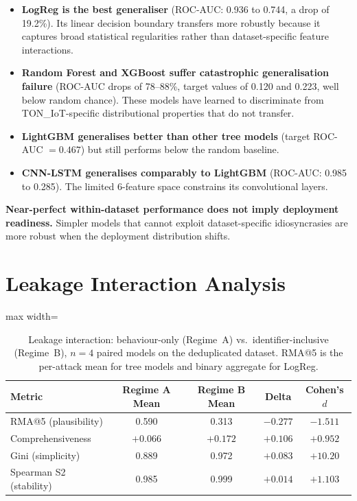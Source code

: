 \documentclass[12pt,a4paper]{report}
\begin{document}
\begin{itemize}
  \item \textbf{LogReg is the best generaliser} (ROC-AUC: 0.936 to 0.744, a drop of 19.2\%). Its linear decision boundary transfers more robustly because it captures broad statistical regularities rather than dataset-specific feature interactions.
  \item \textbf{Random Forest and XGBoost suffer catastrophic generalisation failure} (ROC-AUC drops of 78--88\%, target values of 0.120 and 0.223, well below random chance). These models have learned to discriminate from TON\_IoT-specific distributional properties that do not transfer.
  \item \textbf{LightGBM generalises better than other tree models} (target ROC-AUC $= 0.467$) but still performs below the random baseline.
  \item \textbf{CNN-LSTM generalises comparably to LightGBM} (ROC-AUC: 0.985 to 0.285). The limited 6-feature space constrains its convolutional layers.
\end{itemize}

\textbf{Near-perfect within-dataset performance does not imply deployment readiness.} Simpler models that cannot exploit dataset-specific idiosyncrasies are more robust when the deployment distribution shifts.

\section{Leakage Interaction Analysis}
\label{sec:leakage-results}

\begin{table}[H]
\centering
\caption{Leakage interaction: behaviour-only (Regime~A) vs.\ identifier-inclusive (Regime~B), $n = 4$ paired models on the deduplicated dataset. RMA@5 is the per-attack mean for tree models and binary aggregate for LogReg.}
\label{tab:leakage}
\begin{adjustbox}{max width=\textwidth}
\begin{tabular}{lcccc}
\toprule
\textbf{Metric} & \textbf{Regime A Mean} & \textbf{Regime B Mean} & \textbf{Delta} & \textbf{Cohen's $d$} \\
\midrule
RMA@5 (plausibility) & 0.590 & 0.313 & $-0.277$ & $-1.511$ \\
Comprehensiveness & $+0.066$ & $+0.172$ & $+0.106$ & $+0.952$ \\
Gini (simplicity) & 0.889 & 0.972 & $+0.083$ & $+10.20$ \\
Spearman S2 (stability) & 0.985 & 0.999 & $+0.014$ & $+1.103$ \\
\bottomrule
\end{tabular}
\end{adjustbox}
\end{table}
\end{document}
